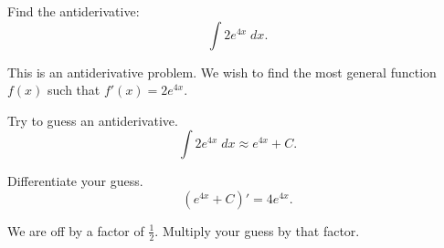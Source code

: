 \documentclass{ximera}
\author{Emma Smith Zbarsky\and Nela Lakos}
\begin{document}
\begin{exercise}

Find the antiderivative: \[\int 2e^{4x}\; dx.\]


\begin{hint}
This is an antiderivative problem. We wish to find the most general
function $f(x)$ such that $f'(x) = 2e^{4x}$.
\end{hint}


\begin{hint}
Try to guess an antiderivative.
\[\int 2e^{4x}\; dx \approx e^{4x}+C.\]
\end{hint}
\begin{hint}
Differentiate your guess.
\[(e^{4x}+C)'= 4e^{4x}.\]
\end{hint}
\begin{hint}
We are off by a factor of $\frac{1}{2}$.
Multiply your guess by  that factor.

\end{hint}
\begin{multipleChoice}
\end{multipleChoice}

\end{exercise}
\end{document}
